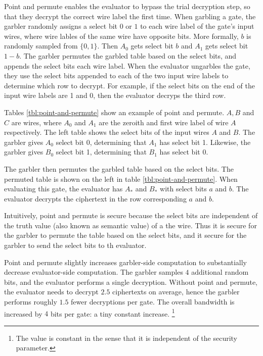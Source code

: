Point and permute enables the evaluator to bypass the trial decryption step, so that they decrypt the correct wire label the first time.
When garbling a gate, the garbler randomly assigns a select bit $0$ or $1$ to each wire label of the gate's input wires, where wire lables of the same wire have opposite bits.
More formally, $b$ is randomly sampled from $\{0,1\}$.
Then $A_0$ gets select bit $b$ and $A_1$ gets select bit $1-b$.
The garbler permutes the garbled table based on the select bits, and appends the select bits each wire label.
When the evaluator ungarbles the gate, they use the select bits appended to each of the two input wire labels to determine which row to decrypt.
For example, if the select bits on the end of the input wire labels are 1 and 0, then the evaluator decryps the third row.

Tables \ref{tbl:point-and-permute} show an example of point and permute.
$A, B$ and $C$ are wires, where $A_0$ and $A_1$ are the zeroith and first wire label of wire $A$ respectively.
The left table shows the select bits of the input wires $A$ and $B$.
The garbler gives $A_0$ select bit 0, determining that $A_1$ has select bit 1.
Likewise, the garbler gives $B_0$ select bit 1, determining that $B_1$ has select bit 0.

The garbler then permutes the garbled table based on the select bits. 
The permuted table is shown on the left in table \ref{tbl:point-and-permute}.
When evaluating this gate, the evaluator has $A_*$ and $B_*$ with select bits $a$ and $b$.
The evaluator decrypts the ciphertext in the row corresponding $a$ and $b$.

Intuitively, point and permute is secure because the select bits are independent of the truth value (also known as semantic value) of a the wire.
Thus it is secure for the garbler to permute the table based on the select bits, and it secure for the garbler to send the select bits to th evaluator.

Point and permute slightly increases garbler-side computation to substantially decrease evaluator-side computation.
The garbler samples $4$ additional random bits, and the evaluator performs a single decryption.
Without point and permute, the evaluator needs to decrypt $2.5$ ciphertexts on average, hence the garbler performs roughly $1.5$ fewer decryptions per gate.
The overall bandwidth is increased by $4$ bits per gate: a tiny constant increase. \footnote{The value is constant in the sense that it is independent of the security parameter.}


